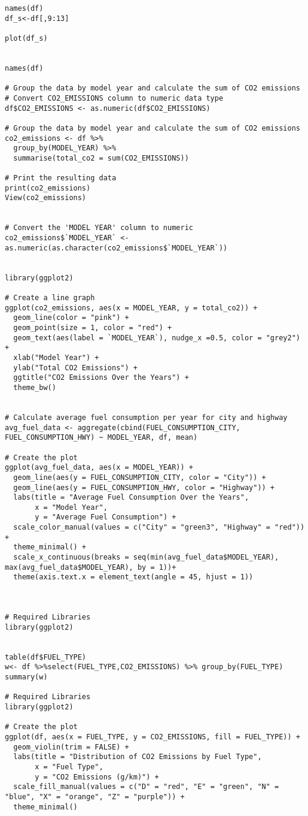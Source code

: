 \documentclass[12pt, a4paper,oneside]{book}
\numberwithin{equation}{section}
\begin{document}
\begin{lstlisting}
names(df)
df_s<-df[,9:13]

plot(df_s)


names(df)

# Group the data by model year and calculate the sum of CO2 emissions
# Convert CO2_EMISSIONS column to numeric data type
df$CO2_EMISSIONS <- as.numeric(df$CO2_EMISSIONS)

# Group the data by model year and calculate the sum of CO2 emissions
co2_emissions <- df %>%
  group_by(MODEL_YEAR) %>%
  summarise(total_co2 = sum(CO2_EMISSIONS))

# Print the resulting data
print(co2_emissions)
View(co2_emissions)


# Convert the 'MODEL YEAR' column to numeric
co2_emissions$`MODEL_YEAR` <- as.numeric(as.character(co2_emissions$`MODEL_YEAR`))


library(ggplot2)

# Create a line graph
ggplot(co2_emissions, aes(x = MODEL_YEAR, y = total_co2)) +
  geom_line(color = "pink") +
  geom_point(size = 1, color = "red") +
  geom_text(aes(label = `MODEL_YEAR`), nudge_x =0.5, color = "grey2") +
  xlab("Model Year") +
  ylab("Total CO2 Emissions") +
  ggtitle("CO2 Emissions Over the Years") +
  theme_bw()


# Calculate average fuel consumption per year for city and highway
avg_fuel_data <- aggregate(cbind(FUEL_CONSUMPTION_CITY, FUEL_CONSUMPTION_HWY) ~ MODEL_YEAR, df, mean)

# Create the plot
ggplot(avg_fuel_data, aes(x = MODEL_YEAR)) +
  geom_line(aes(y = FUEL_CONSUMPTION_CITY, color = "City")) +
  geom_line(aes(y = FUEL_CONSUMPTION_HWY, color = "Highway")) +
  labs(title = "Average Fuel Consumption Over the Years",
       x = "Model Year",
       y = "Average Fuel Consumption") +
  scale_color_manual(values = c("City" = "green3", "Highway" = "red")) +
  theme_minimal() +
  scale_x_continuous(breaks = seq(min(avg_fuel_data$MODEL_YEAR), max(avg_fuel_data$MODEL_YEAR), by = 1))+
  theme(axis.text.x = element_text(angle = 45, hjust = 1))



# Required Libraries
library(ggplot2)


table(df$FUEL_TYPE)
w<- df %>%select(FUEL_TYPE,CO2_EMISSIONS) %>% group_by(FUEL_TYPE)
summary(w)

# Required Libraries
library(ggplot2)

# Create the plot
ggplot(df, aes(x = FUEL_TYPE, y = CO2_EMISSIONS, fill = FUEL_TYPE)) +
  geom_violin(trim = FALSE) +
  labs(title = "Distribution of CO2 Emissions by Fuel Type",
       x = "Fuel Type",
       y = "CO2 Emissions (g/km)") +
  scale_fill_manual(values = c("D" = "red", "E" = "green", "N" = "blue", "X" = "orange", "Z" = "purple")) +
  theme_minimal()


\end{lstlisting}
\end{document}
